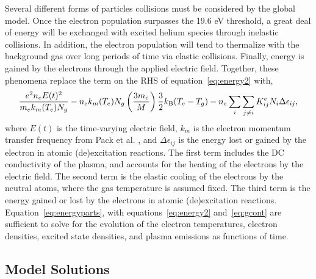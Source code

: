 Several different forms of particles collisions must be considered by the global
model. Once the electron population surpasses the 19.6 eV threshold, a great
deal of energy will be exchanged with excited helium species through inelastic
collisions. In addition, the electron population will tend to thermalize with
the background gas over long periods of time via elastic collisions. Finally,
energy is gained by the electrons through the applied electric field. Together,
these phenomena replace the term on the RHS of equation~\ref{eq:energy2} with,
\begin{equation}
  \frac{e^2n_eE(t)^2}{m_ek_m(T_e)N_g}
  - n_ek_m(T_e)N_g\left(\frac{3m_e}{M}\right)\frac{3}{2}k_\mathrm{B}(T_e-T_g)
  - n_e \sum_i \sum_{j\neq i} K^e_{ij}N_i\Delta\epsilon_{ij},
  \label{eq:energyparts}
\end{equation}
where $E(t)$ is the time-varying electric field, $k_m$ is the electron momentum
transfer frequency from Pack et al. \cite{Pack1992}, and $\Delta\epsilon_{ij}$
is the energy lost or gained by the electron in atomic (de)excitation reactions.
The first term includes the DC conductivity \cite{Lieberman2005} of the plasma,
and accounts for the heating of the electrons by the electric field. The second
term is the elastic cooling of the electrons by the neutral atoms, where the gas
temperature is assumed fixed. The third term is the energy gained or lost by the
electrons in atomic (de)excitation reactions. Equation~\ref{eq:energyparts},
with equations~\ref{eq:energy2} and~\ref{eq:gcont} are sufficient to solve for
the evolution of the electron temperatures, electron densities, excited state
densities, and plasma emissions as functions of time.

\subsection{Model Solutions}

